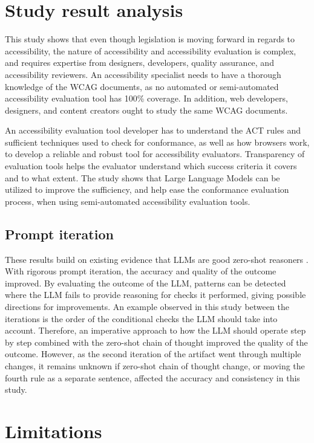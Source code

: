 \section{Study result analysis}

This study shows that even though legislation is moving forward in regards to accessibility, the nature of accessibility and accessibility evaluation is complex, and requires expertise from designers, developers, quality assurance, and accessibility reviewers. An accessibility specialist needs to have a thorough knowledge of the WCAG documents, as no automated or semi-automated accessibility evaluation tool has 100\% coverage. In addition, web developers, designers, and content creators ought to study the same WCAG documents. 

An accessibility evaluation tool developer has to understand the ACT rules and sufficient techniques used to check for conformance, as well as how browsers work, to develop a reliable and robust tool for accessibility evaluators. Transparency of evaluation tools helps the evaluator understand which success criteria it covers and to what extent. The study shows that Large Language Models can be utilized to improve the sufficiency, and help ease the conformance evaluation process, when using semi-automated accessibility evaluation tools. 

\subsection{Prompt iteration}

These results build on existing evidence that LLMs are good zero-shot reasoners \citep{kojima2023large}. With rigorous prompt iteration, the accuracy and quality of the outcome improved. By evaluating the outcome of the LLM, patterns can be detected where the LLM fails to provide reasoning for checks it performed, giving possible directions for improvements. An example observed in this study between the iterations is the order of the conditional checks the LLM should take into account. Therefore, an imperative approach to how the LLM should operate step by step combined with the zero-shot chain of thought improved the quality of the outcome. However, as the second iteration of the artifact went through multiple changes, it remains unknown if \textcite{kojima2023large} zero-shot chain of thought change, or moving the fourth rule as a separate sentence, affected the accuracy and consistency in this study.

\section{Limitations}

